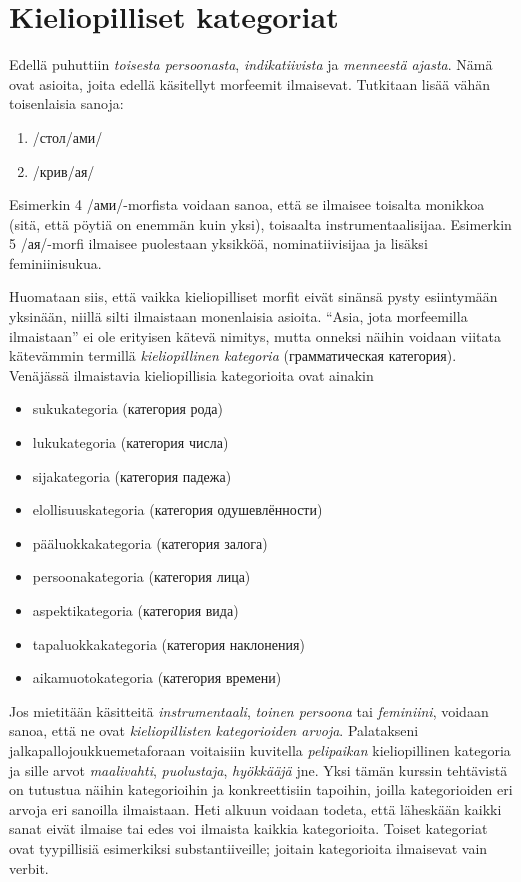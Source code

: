 \documentclass[]{scrreprt}
\providecommand{\tightlist}{%
  \setlength{\itemsep}{0pt}\setlength{\parskip}{0pt}}
\begin{document}
\section{Kieliopilliset kategoriat}\label{kieliopilliset-kategoriat}

Edellä puhuttiin \emph{toisesta persoonasta}, \emph{indikatiivista} ja
\emph{menneestä ajasta}. Nämä ovat asioita, joita edellä käsitellyt
morfeemit ilmaisevat. Tutkitaan lisää vähän toisenlaisia sanoja:

\begin{enumerate}
\def\labelenumi{(\arabic{enumi})}
\setcounter{enumi}{3}
\tightlist
\item
  /стол/ами/
\item
  /крив/ая/
\end{enumerate}

Esimerkin 4 /ами/-morfista voidaan sanoa, että se ilmaisee toisalta
monikkoa (sitä, että pöytiä on enemmän kuin yksi), toisaalta
instrumentaalisijaa. Esimerkin 5 /ая/-morfi ilmaisee puolestaan
yksikköä, nominatiivisijaa ja lisäksi feminiinisukua.

Huomataan siis, että vaikka kieliopilliset morfit eivät sinänsä pysty
esiintymään yksinään, niillä silti ilmaistaan monenlaisia asioita.
``Asia, jota morfeemilla ilmaistaan'' ei ole erityisen kätevä nimitys,
mutta onneksi näihin voidaan viitata kätevämmin termillä
\emph{kieliopillinen kategoria} (грамматическая категория). Venäjässä
ilmaistavia kieliopillisia kategorioita ovat ainakin

\begin{itemize}
\tightlist
\item
  sukukategoria (категория рода)
\item
  lukukategoria (категория числа)
\item
  sijakategoria (категория падежа)
\item
  elollisuuskategoria (категория одушевлённости)
\item
  pääluokkakategoria (категория залога)
\item
  persoonakategoria (категория лица)
\item
  aspektikategoria (категория вида)
\item
  tapaluokkakategoria (категория наклонения)
\item
  aikamuotokategoria (категория времени)
\end{itemize}

Jos mietitään käsitteitä \emph{instrumentaali}, \emph{toinen persoona}
tai \emph{feminiini}, voidaan sanoa, että ne ovat \emph{kieliopillisten
kategorioiden arvoja}. Palatakseni jalkapallojoukkuemetaforaan
voitaisiin kuvitella \emph{pelipaikan} kieliopillinen kategoria ja sille
arvot \emph{maalivahti}, \emph{puolustaja}, \emph{hyökkääjä} jne. Yksi
tämän kurssin tehtävistä on tutustua näihin kategorioihin ja
konkreettisiin tapoihin, joilla kategorioiden eri arvoja eri sanoilla
ilmaistaan. Heti alkuun voidaan todeta, että läheskään kaikki sanat
eivät ilmaise tai edes voi ilmaista kaikkia kategorioita. Toiset
kategoriat ovat tyypillisiä esimerkiksi substantiiveille; joitain
kategorioita ilmaisevat vain verbit.
\end{document}
